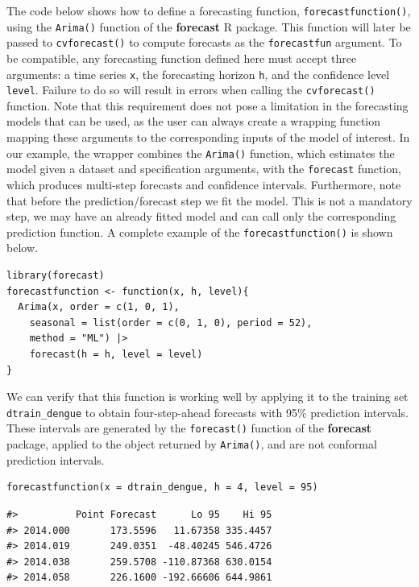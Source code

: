 The code below shows how to define a forecasting function,
\texttt{forecastfunction()}, using the \texttt{Arima()} function of the \textbf{forecast} R
package. This function will later be passed to \texttt{cvforecast()} to compute
forecasts as the \texttt{forecastfun} argument. To be compatible, any
forecasting function defined here must accept three arguments: a time
series \texttt{x}, the forecasting horizon \texttt{h}, and the confidence level
\texttt{level}. Failure to do so will result in errors when calling the
\texttt{cvforecast()} function. Note that this requirement does not pose a
limitation in the forecasting models that can be used, as the user can
always create a wrapping function mapping these arguments to the
corresponding inputs of the model of interest. In our example, the
wrapper combines the \texttt{Arima()} function, which estimates the model given
a dataset and specification arguments, with the \texttt{forecast} function,
which produces multi-step forecasts and confidence intervals.
Furthermore, note that before the prediction/forecast step we fit the
model. This is not a mandatory step, we may have an already fitted model
and can call only the corresponding prediction function. A complete
example of the \texttt{forecastfunction()} is shown below.

\begin{verbatim}
library(forecast)
forecastfunction <- function(x, h, level){
  Arima(x, order = c(1, 0, 1), 
    seasonal = list(order = c(0, 1, 0), period = 52),
    method = "ML") |>
    forecast(h = h, level = level)
}
\end{verbatim}

We can verify that this function is working well by applying it to the
training set \texttt{dtrain\_dengue} to obtain four-step-ahead forecasts with
95\% prediction intervals. These intervals are generated by the
\texttt{forecast()} function of the \textbf{forecast} package, applied to the object
returned by \texttt{Arima()}, and are not conformal prediction intervals.

\begin{verbatim}
forecastfunction(x = dtrain_dengue, h = 4, level = 95)
\end{verbatim}

\begin{verbatim}
#>          Point Forecast      Lo 95    Hi 95
#> 2014.000       173.5596   11.67358 335.4457
#> 2014.019       249.0351  -48.40245 546.4726
#> 2014.038       259.5708 -110.87368 630.0154
#> 2014.058       226.1600 -192.66606 644.9861
\end{verbatim}

